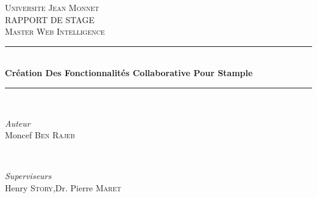 \documentclass[12pt]{article}
\begin{document}
\begin{titlepage}

\newcommand{\HRule}{\rule{\linewidth}{0.9mm}} %

\center %
 


\textsc{\LARGE Universite Jean Monnet}\\[1.5cm] %
\textsc{\Large RAPPORT DE STAGE}\\[0.5cm] %
\textsc{\large Master Web Intelligence}\\[0.5cm] %


\HRule \\[1.2cm]
{ \huge \bfseries Cr\'eation Des Fonctionnalit\'es Collaborative Pour Stample}\\[1.3cm] %
\HRule \\[3cm]
 

\begin{minipage}{0.45\textwidth}
\begin{flushleft} \large
\emph{Auteur}\\
Moncef \textsc{Ben Rajeb} %
\end{flushleft}
\end{minipage}
~
\begin{minipage}{0.50\textwidth}
\begin{flushleft} \large
\emph{Superviseurs} \\
Henry \textsc{Story},\newline Dr. Pierre \textsc{Maret} %


\end{flushleft}
\end{minipage}
\end{titlepage}
\end{document}
